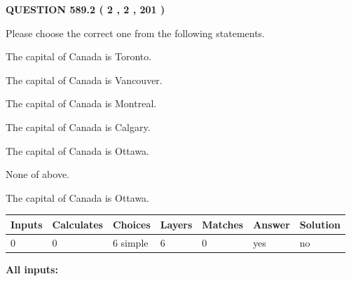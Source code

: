 \documentclass[12pt]{article}
\begin{document}
   
  
\vspace{0.2in}
  
{\textbf{\Large{QUESTION
589.2 
 ( 2 , 2 , 201 )
}}}
  
  
Please choose the correct one from the following statements.
 
 
The capital of Canada is Toronto.
 
 
The capital of Canada is Vancouver.
 
 
The capital of Canada is Montreal.
 
 
The capital of Canada is Calgary.
 
 
The capital of Canada is Ottawa.
 
 
 None of above.
 
 
\noindent{}
 
 
The capital of Canada is Ottawa.
 
 
\noindent{}
 
 
   
   
   
   
\noindent\begin{tabular}{|l|l|l|l|l|l|l|}
 \hline
Inputs & Calculates & Choices & Layers & Matches & Answer & Solution \\ \hline
 0  & 
 0  & 
 6
  simple  
  & 
 6  & 
 0  & 
  yes & 
  no 
  \\ \hline
 \end{tabular}
   
   
   
   
\noindent{}
   
   
   
   
\noindent\vspace{0.1in}\hspace{-0.08in} {\textbf{\Large{All inputs: }}}
   
   
   
   
   
   
 \vspace{0.2in}
 
   
   
\end{document}
